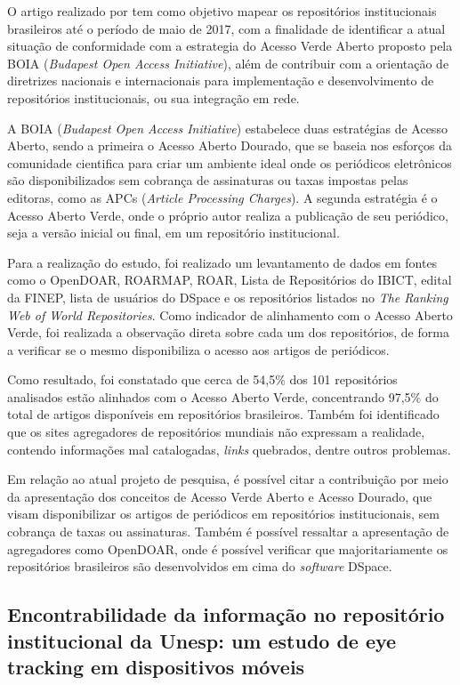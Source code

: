 O artigo realizado por \cite{Weitzel:2019} tem como objetivo mapear
os repositórios institucionais brasileiros até o período de maio de 2017,
com a finalidade de identificar a atual situação de conformidade com
a estrategia do Acesso Verde Aberto proposto pela BOIA (\emph{Budapest Open Access Initiative}),
além de contribuir com a orientação de diretrizes nacionais e internacionais
para implementação e desenvolvimento de repositórios institucionais, ou sua integração
em rede.

A BOIA (\emph{Budapest Open Access Initiative}) estabelece duas estratégias
de Acesso Aberto, sendo a primeira o Acesso Aberto Dourado, que se baseia
nos esforços da comunidade cientifica para criar um ambiente ideal onde
os periódicos eletrônicos são disponibilizados sem cobrança de assinaturas
ou taxas impostas pelas editoras, como as APCs (\emph{Article Processing Charges}).
A segunda estratégia é o Acesso Aberto Verde, onde o próprio autor
realiza a publicação de seu periódico, seja a versão inicial ou
final, em um repositório institucional.

Para a realização do estudo, foi realizado um levantamento de dados em
fontes como o OpenDOAR, ROARMAP, ROAR, Lista de Repositórios do IBICT,
edital da FINEP, lista de usuários do DSpace e os repositórios listados
no \emph{The Ranking Web of World Repositories}. Como indicador de
alinhamento com o Acesso Aberto Verde, foi realizada a observação
direta sobre cada um dos repositórios, de forma a verificar se o mesmo
disponibiliza o acesso aos artigos de periódicos.

Como resultado, foi constatado que cerca de 54,5\% dos 101 repositórios
analisados estão alinhados com o Acesso Aberto Verde, concentrando 97,5\%
do total de artigos disponíveis em repositórios brasileiros. Também foi
identificado que os sites agregadores de repositórios mundiais não
expressam a realidade, contendo informações mal catalogadas,
\emph{links} quebrados, dentre outros problemas.

Em relação ao atual projeto de pesquisa, é possível citar a contribuição
por meio da apresentação dos conceitos de Acesso Verde Aberto e Acesso
Dourado, que visam disponibilizar os artigos de periódicos em repositórios
institucionais, sem cobrança de taxas ou assinaturas. Também é possível
ressaltar a apresentação de agregadores como OpenDOAR, onde é possível
verificar que majoritariamente os repositórios brasileiros são
desenvolvidos em cima do \emph{software} DSpace.

\subsection{Encontrabilidade da informação no repositório institucional da Unesp: um estudo de eye tracking em dispositivos móveis}

